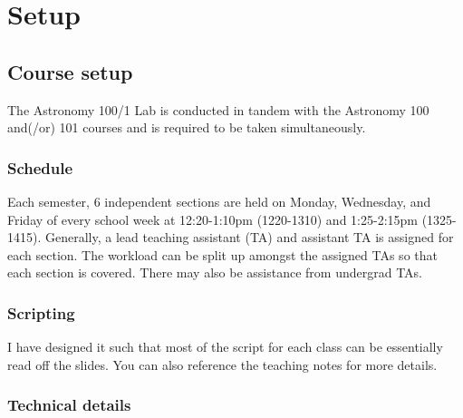 \documentclass[12pt]{article}
\begin{document}
\section{Setup}

\subsection{Course setup}

The Astronomy 100/1 Lab is conducted in tandem with the Astronomy 100 and(/or) 101 courses and is required to be taken simultaneously.


\subsubsection{Schedule}

Each semester, 6 independent sections are held on Monday, Wednesday, and Friday of every school week at 12:20-1:10pm (1220-1310) and 1:25-2:15pm (1325-1415). Generally, a lead teaching assistant (TA) and assistant TA is assigned for each section. The workload can be split up amongst the assigned TAs so that each section is covered. There may also be assistance from undergrad TAs.


\subsubsection{Scripting}

I have designed it such that most of the script for each class can be essentially read off the slides. You can also reference the teaching notes for more details.


\subsubsection{Technical details}
\end{document}
